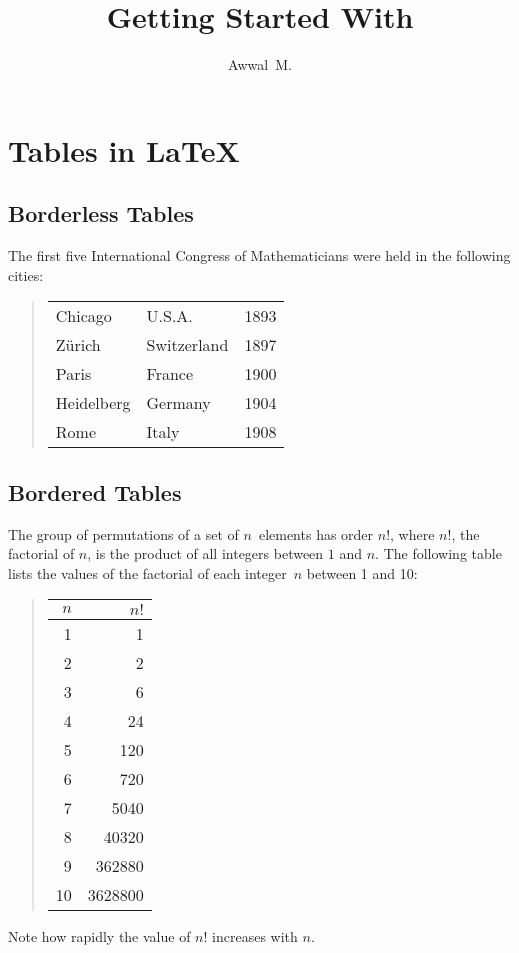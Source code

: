\documentclass[a4paper,12pt]{article}
\begin{document}
\title{Getting Started With \LaTeXe{}}
\author{Awwal~M.}
\maketitle

\section{Tables in \LaTeX{}}

\subsection{Borderless Tables}
The first five International Congress of Mathematicians were held
in the following cities:
\begin{quote}
	\begin{tabular}{lll}
		Chicago & U.S.A. & 1893\\
		Z\"{u}rich & Switzerland & 1897\\
		Paris & France & 1900\\
		Heidelberg & Germany & 1904\\
		Rome & Italy & 1908\\
	\end{tabular}
\end{quote}

\subsection{Bordered Tables}
The group of permutations of a set of $n$~elements has order $n!$, where $n!$, 
the factorial of $n$, is the product of all integers between $1$ and $n$. 
The following table lists the values of the factorial of each integer~$n$ 
between 1 and 10:
\begin{quote}
\begin{tabular}{|r|r|}
	\hline  %
	$n$ & $n!$\\
	\hline
	1 & 1\\
	2 & 2\\ 
	3 & 6\\
	4 & 24\\
	5 & 120\\
	6 & 720\\
	7 & 5040\\
	8 & 40320\\
	9 & 362880\\
	10 & 3628800\\
	\hline
\end{tabular}
\end{quote}
Note how rapidly the value of $n!$ increases with $n$.
\end{document}
